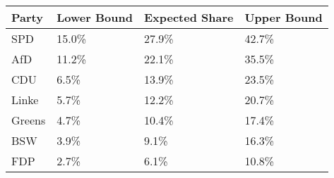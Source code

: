 \begin{tabular}{llll}
  \hline
Party & Lower Bound & Expected Share & Upper Bound \\ 
  \hline
SPD & 15.0\% & 27.9\% & 42.7\% \\ 
  AfD & 11.2\% & 22.1\% & 35.5\% \\ 
  CDU & 6.5\% & 13.9\% & 23.5\% \\ 
  Linke & 5.7\% & 12.2\% & 20.7\% \\ 
  Greens & 4.7\% & 10.4\% & 17.4\% \\ 
  BSW & 3.9\% & 9.1\% & 16.3\% \\ 
  FDP & 2.7\% & 6.1\% & 10.8\% \\ 
   \hline
\end{tabular}
